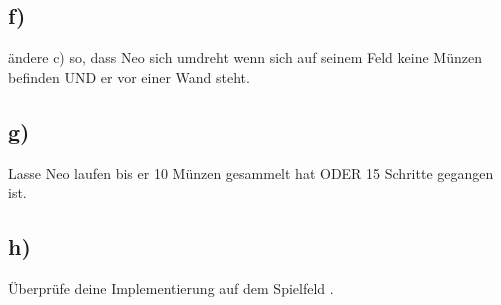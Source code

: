 	\subsection*{f)}
	ändere c) so, dass Neo sich umdreht wenn sich auf seinem Feld keine Münzen befinden UND er vor einer Wand steht.

\subsection*{g)}
Lasse Neo laufen bis er 10 Münzen gesammelt hat ODER 15 Schritte gegangen ist.

\subsection*{h)}
Überprüfe deine Implementierung auf dem Spielfeld .
